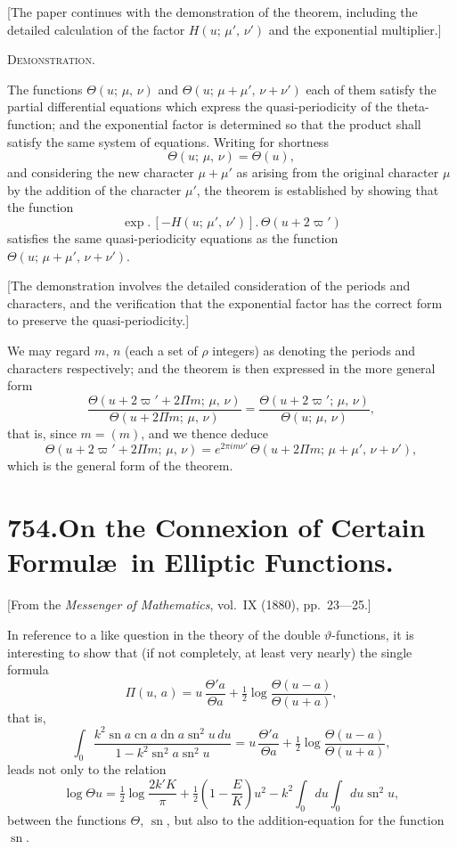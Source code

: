 \documentclass[12pt,a4paper]{article}
\begin{document}
[The paper continues with the demonstration of the theorem, including the detailed calculation of the factor $H(u;\, \mu',\, \nu')$ and the exponential multiplier.]

\medskip

\noindent\textsc{Demonstration.}

The functions $\Theta(u;\, \mu,\, \nu)$ and $\Theta(u;\, \mu + \mu',\, \nu + \nu')$ each of them satisfy the partial differential equations which express the quasi-periodicity of the theta-function; and the exponential factor is determined so that the product shall satisfy the same system of equations. Writing for shortness
\[
\Theta(u;\, \mu,\, \nu) = \Theta(u),
\]
and considering the new character $\mu + \mu'$ as arising from the original character $\mu$ by the addition of the character $\mu'$, the theorem is established by showing that the function
\[
\exp.\,[-H(u;\, \mu',\, \nu')].\, \Theta(u + 2\varpi')
\]
satisfies the same quasi-periodicity equations as the function $\Theta(u;\, \mu + \mu',\, \nu + \nu')$.

[The demonstration involves the detailed consideration of the periods and characters, and the verification that the exponential factor has the correct form to preserve the quasi-periodicity.]

We may regard $m$, $n$ (each a set of $\rho$ integers) as denoting the periods and characters respectively; and the theorem is then expressed in the more general form
\[
\frac{\Theta(u + 2\varpi' + 2\Pi m;\, \mu,\, \nu)}{\Theta(u + 2\Pi m;\, \mu,\, \nu)} = \frac{\Theta(u + 2\varpi';\, \mu,\, \nu)}{\Theta(u;\, \mu,\, \nu)},
\]
that is, since $m = (m)$, and we thence deduce
\[
\Theta(u + 2\varpi' + 2\Pi m;\, \mu,\, \nu) = e^{2\pi i m \nu'}\, \Theta(u + 2\Pi m;\, \mu + \mu',\, \nu + \nu'),
\]
which is the general form of the theorem.


\newpage
\section*{\textbf{754.}\quad On the Connexion of Certain Formul\ae\ in Elliptic Functions.}

[From the \textit{Messenger of Mathematics}, vol.~IX (1880), pp.~23---25.]

\medskip

In reference to a like question in the theory of the double $\vartheta$-functions, it is interesting to show that (if not completely, at least very nearly) the single formula
\[
\Pi(u,\, a) = u\, \frac{\Theta'a}{\Theta a} + \tfrac{1}{2}\log \frac{\Theta(u-a)}{\Theta(u+a)},
\]
that is,
\[
\int_0 \frac{k^2 \operatorname{sn} a \operatorname{cn} a \operatorname{dn} a \operatorname{sn}^2 u\, du}{1 - k^2 \operatorname{sn}^2 a \operatorname{sn}^2 u} = u\, \frac{\Theta'a}{\Theta a} + \tfrac{1}{2}\log \frac{\Theta(u-a)}{\Theta(u+a)},
\]
leads not only to the relation
\[
\log \Theta u = \tfrac{1}{2}\log \frac{2k'K}{\pi} + \tfrac{1}{2}\left(1 - \frac{E}{K}\right)u^2 - k^2 \int_0 du \int_0 du \operatorname{sn}^2 u,
\]
between the functions $\Theta$, $\operatorname{sn}$, but also to the addition-equation for the function $\operatorname{sn}$.
\end{document}
